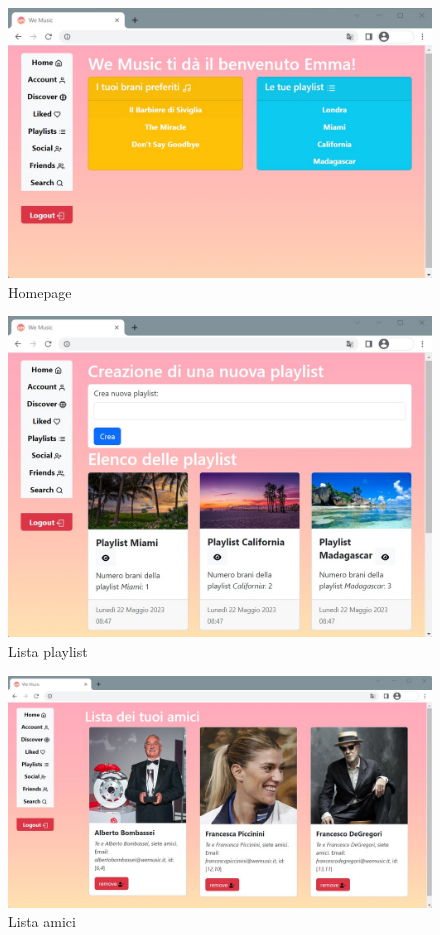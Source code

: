\begin{figure}[H]
    \centering
    \includegraphics[scale=0.55]{images/homepage_ver2.jpg}
    \caption{Homepage}
    \label{fig-homepage}
\end{figure}
\newpage

\begin{figure}[H]
    \centering
    \includegraphics[scale=0.5]{images/playlist_ver2.jpg}
    \caption{Lista playlist}
    \label{fig-playlist}
\end{figure}
\vspace{10pt}
\begin{figure}[H]
    \centering
    \includegraphics[scale=0.4]{images/amici_ver2.jpg}
    \caption{Lista amici}
    \label{fig-friendslist}
\end{figure}